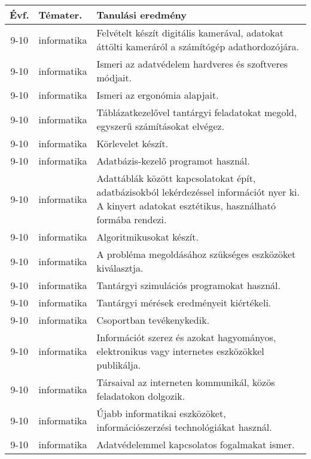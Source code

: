 \begin{small}
  \begin{longtable}{c | p{2cm} |  p{11cm} }
    \textbf{Évf.} & \textbf{Témater.} & \textbf{Tanulási eredmény} \\ \hline \hline
    \endhead

              9-10 & informatika & Felvételt készít digitális kamerával, adatokat áttölti kameráról a számítógép adathordozójára. \\ \hline
              9-10 & informatika & Ismeri az adatvédelem hardveres és szoftveres módjait. \\ \hline
              9-10 & informatika & Ismeri az ergonómia alapjait. \\ \hline
              9-10 & informatika & Táblázatkezelővel tantárgyi feladatokat megold, egyszerű számításokat elvégez. \\ \hline
              9-10 & informatika & Körlevelet készít. \\ \hline
              9-10 & informatika & Adatbázis-kezelő programot használ. \\ \hline
              9-10 & informatika & Adattáblák között kapcsolatokat épít, adatbázisokból lekérdezéssel információt nyer ki. A kinyert adatokat esztétikus, használható formába rendezi. \\ \hline
              9-10 & informatika & Algoritmikusokat készít. \\ \hline
              9-10 & informatika & A probléma megoldásához szükséges eszközöket kiválasztja. \\ \hline
              9-10 & informatika & Tantárgyi szimulációs programokat használ. \\ \hline
              9-10 & informatika & Tantárgyi mérések eredményeit kiértékeli. \\ \hline
              9-10 & informatika & Csoportban tevékenykedik. \\ \hline
              9-10 & informatika & Információt szerez és azokat hagyományos, elektronikus vagy internetes eszközökkel publikálja. \\ \hline
              9-10 & informatika & Társaival az interneten kommunikál, közös feladatokon dolgozik. \\ \hline
              9-10 & informatika & Újabb informatikai eszközöket, információszerzési technológiákat használ. \\ \hline
              9-10 & informatika & Adatvédelemmel kapcsolatos fogalmakat ismer. \\ \hline

\end{longtable}
\end{small}

